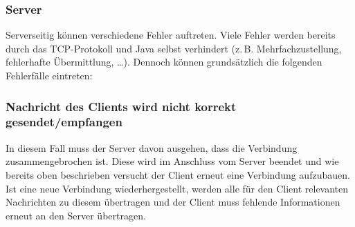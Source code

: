 \subsubsection{Server}
Serverseitig können verschiedene Fehler auftreten. Viele Fehler werden bereits durch das TCP-Protokoll und Java selbst verhindert 
(z.\,B. Mehrfachzustellung, fehlerhafte Übermittlung, \dots). Dennoch können grundsätzlich die folgenden Fehlerfälle eintreten:

\subsubsection*{Nachricht des Clients wird nicht korrekt gesendet/empfangen}
In diesem Fall muss der Server davon ausgehen, dass die Verbindung zusammengebrochen ist. Diese wird im Anschluss vom Server beendet
und wie bereits oben beschrieben versucht der Client erneut eine Verbindung aufzubauen.
Ist eine neue Verbindung wiederhergestellt, werden alle für den Client relevanten Nachrichten zu diesem übertragen 
und der Client muss fehlende Informationen erneut an den Server übertragen.

